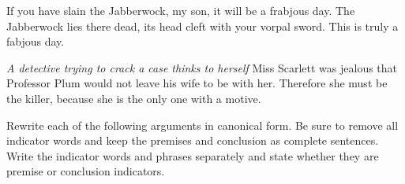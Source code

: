 \begin{exercises}
\item If you have slain the Jabberwock, my son, it will be a frabjous day. The Jabberwock lies there dead, its head cleft with your vorpal sword. This is truly a fabjous day. 

\item \textit{A detective trying to crack a case thinks to herself} Miss Scarlett was jealous that Professor Plum would not leave his wife to be with her. Therefore she must be the killer, because she is the only one with a motive. 
\end{exercises}



\noindent\problempart Rewrite each of the following arguments in canonical form. Be sure to remove all indicator words and keep the premises and conclusion as complete sentences. Write the indicator words and phrases separately and state whether they are premise or conclusion indicators. 


